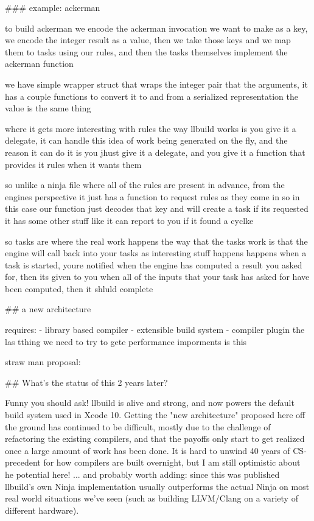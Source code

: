 \documentclass[12pt, a4paper]{report}
\begin{document}
### example: ackerman

  to build ackerman we encode the ackerman invocation we want to make as a key, we encode the integer result as a value, then we take those keys and we map them to tasks using our rules, and then the tasks themselves implement the ackerman function

  we have simple wrapper struct that wraps the integer pair that the arguments,
  it has a couple functions to convert it to and from a serialized representation
  the value is the same thing

  where it gets more interesting with rules
  the way llbuild works is you give it a delegate,
  it can handle this idea of work being generated on the fly, and the reason it can do it is you jhust give it a delegate, and you give it a function that provides it rules when it wants them

  so unlike a ninja file where all of the rules are present in advance, from the engines perspective it just has a function to request rules as they come in
  so in this case our function just decodes that key and will create a task if its requested
  it has some other stuff like it can report to you if it found a cyclke

  so tasks are where the real work happens
  the way that the tasks work is that the engine will call back into your tasks as interesting stuff happens happens
  when a task is started, youre notified
  when the engine has computed a result you asked for, then its given to you
  when all of the inputs that your task has asked for have been computed, then it shluld complete

## a new architecture

  requires:
  - library based compiler
  - extensible build system
  - compiler plugin
    the las tthing we need to try to gete performance imporments is this

  straw man proposal:

## What's the status of this 2 years later?

  Funny you should ask! llbuild is alive and strong, and now powers the default build system used in Xcode 10. Getting the "new architecture" proposed here off the ground has continued to be difficult, mostly due to the challenge of refactoring the existing compilers, and that the payoffs only start to get realized once a large amount of work has been done. It is hard to unwind 40 years of CS-precedent for how compilers are built overnight, but I am still optimistic about
  he potential here!
  ... and probably worth adding: since this was published llbuild's own Ninja implementation usually outperforms the actual Ninja on most real world situations we've seen (such as building LLVM/Clang on a variety of different hardware).
\end{document}

